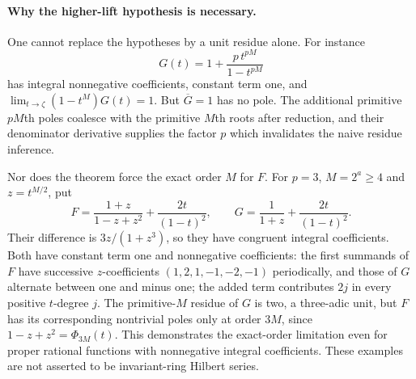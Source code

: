 \paragraph{Why the higher-lift hypothesis is necessary.}
One cannot replace the hypotheses by a unit residue alone.
For instance
\[
 G(t)=1+\frac{p\,t^{pM}}{1-t^{pM}}
 \tag{PNEW-M8}
\]
has integral nonnegative coefficients, constant term one,
and $\lim_{t\to\zeta}(1-t^M)G(t)=1$.
But $\overline G=1$ has no pole. The additional primitive
$pM$th poles coalesce with the primitive $M$th roots after
reduction, and their denominator derivative supplies the
factor $p$ which invalidates the naive residue inference.

Nor does the theorem force the exact order $M$ for $F$.
For $p=3$, $M=2^a\ge4$ and $z=t^{M/2}$, put
\[
 F=\frac{1+z}{1-z+z^2}+\frac{2t}{(1-t)^2},\qquad
 G=\frac1{1+z}+\frac{2t}{(1-t)^2}.
 \tag{PNEW-M10}
\]
Their difference is $3z/(1+z^3)$, so they have congruent
integral coefficients. Both have constant term one and
nonnegative coefficients: the first summands of $F$ have
successive $z$-coefficients $(1,2,1,-1,-2,-1)$ periodically,
and those of $G$ alternate between one and minus one;
the added term contributes $2j$ in every positive $t$-degree
$j$. The primitive-$M$ residue of $G$ is two, a three-adic
unit, but $F$ has its corresponding nontrivial poles only
at order $3M$, since $1-z+z^2=\Phi_{3M}(t)$.
This demonstrates the exact-order limitation even for proper
rational functions with nonnegative integral coefficients.
These examples are not asserted to be invariant-ring Hilbert
series.

